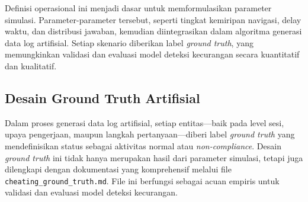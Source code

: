 Definisi operasional ini menjadi dasar untuk memformulasikan parameter simulasi. Parameter-parameter tersebut, seperti tingkat kemiripan navigasi, delay waktu, dan distribusi jawaban, kemudian diintegrasikan dalam algoritma generasi data log artifisial. Setiap skenario diberikan label \textit{ground truth}, yang memungkinkan validasi dan evaluasi model deteksi kecurangan secara kuantitatif dan kualitatif.

\subsection{Desain Ground Truth Artifisial}
\label{sec:desainGroundTruthArtifisial}
Dalam proses generasi data log artifisial, setiap entitas—baik pada level sesi, upaya pengerjaan, maupun langkah pertanyaan—diberi label \textit{ground truth} yang mendefinisikan status sebagai aktivitas normal atau \textit{non-compliance}. Desain \textit{ground truth} ini tidak hanya merupakan hasil dari parameter simulasi, tetapi juga dilengkapi dengan dokumentasi yang komprehensif melalui file \texttt{cheating\_ground\_truth.md}. File ini berfungsi sebagai acuan empiris untuk validasi dan evaluasi model deteksi kecurangan.


